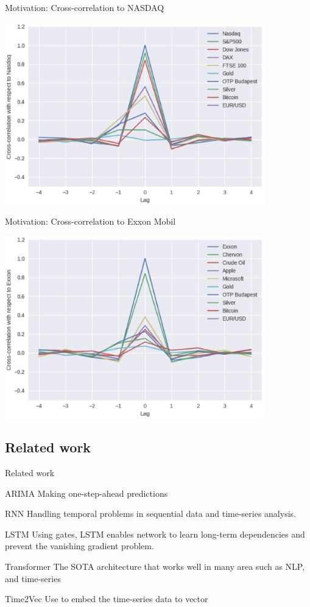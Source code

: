 \documentclass[compress, mathserif, fleqn, 10pt]{beamer}
\begin{document}
	\begin{frame}{Motivation: Cross-correlation to NASDAQ}
		\centerline{\includegraphics[width=0.85\textwidth]{images/nas_base.eps}}
	\end{frame}
	
	\begin{frame}{Motivation: Cross-correlation to Exxon Mobil}
		\centerline{\includegraphics[width=0.85\textwidth]{images/exx_base.eps}}
	\end{frame}
	
	\subsection{Related work}
	\begin{frame}{Related work}
		\begin{block}{ARIMA}
			Making one-step-ahead predictions
		\end{block}
		\begin{block}{RNN}
			Handling temporal problems in sequential data and time-series analysis.
		\end{block}
		\begin{block}{LSTM}
			Using gates, LSTM enables network to learn long-term dependencies and
			prevent the vanishing gradient problem.
		\end{block}
		\begin{block}{Transformer}
			The SOTA architecture that works well in many area such as NLP, and time-series
		\end{block}
		\begin{block}{Time2Vec}
			Use to embed the time-series data to vector
		\end{block}
	\end{frame}
	
\end{document}
